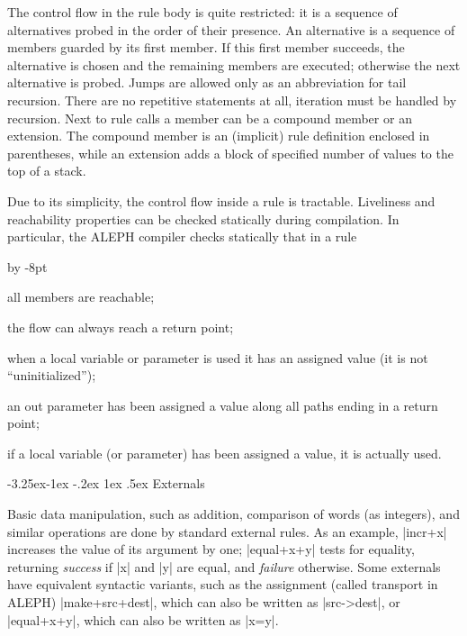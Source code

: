 \documentclass[titlepage]{article}
\makeatletter
\newcommand\A{\textsf{ALEPH}}
\renewenvironment{itemize}{\begin{list}{}{%
\advance\leftmargin by -8pt%
\setlength\itemsep{0ex plus 0.2ex}%
\setlength\partopsep{3pt}%
\setlength\topsep{2pt plus 2pt}%
\setlength\parsep{0pt plus 2pt}%
}}{\end{list}}
\newcommand\g[1]{\textsf{\color{blue!90!black}#1}}
\renewcommand\subsection{%
\@startsection{subsection}{2}{\z@}%
   {-3.25ex\@plus -1ex \@minus -.2ex}%
   {1ex \@plus .5ex}%
   {\normalfont\normalsize\bfseries}}
\makeatother
\begin{document}
The control flow in the rule body is quite restricted: it is a sequence of
alternatives probed in the order of their presence. An alternative is a
sequence of members guarded by its first member. If this first member
succeeds, the alternative is chosen and the remaining members are executed;
otherwise the next alternative is probed. Jumps are allowed only as an
abbreviation for tail recursion. There are no repetitive statements at all,
iteration must be handled by recursion. Next to rule calls a member can be a
\g{compound member} or an \g{extension}. The compound member is an
(implicit) rule definition enclosed in parentheses, while an extension adds
a block of specified number of values to the top of a \g{stack}.

Due to its simplicity, the control flow inside a rule is tractable.
Liveliness and reachability properties can be checked statically during
compilation. In particular, the \A{} compiler checks statically that in a
rule
\begin{itemize}
\item[\textbullet] all members are reachable;
\item[\textbullet] the flow can always reach a return point;
\item[\textbullet] when a local variable or parameter is used it has an
  assigned value (it is not ``uninitialized'');
\item[\textbullet] an out parameter has been assigned a value along all paths
 ending in a return point;
\item[\textbullet] if a local variable (or parameter) has been assigned a
value, it is actually used.
\end{itemize}

\subsection{Externals}\label{subsec:bird-ext}

Basic data manipulation, such as addition, comparison of words (as
integers), and similar operations are done by standard external rules. As
an example, \pp|incr+x| increases the value of its argument by one;
\pp|equal+x+y| tests for equality, returning \emph{success} if \pp|x| and
\pp|y| are equal, and \emph{failure} otherwise. Some externals have
equivalent syntactic variants, such as the assignment (called \g{transport}
in \A) \pp|make+src+dest|, which can also be written as \pp|src->dest|, or
\pp|equal+x+y|, which can also be written as \pp|x=y|.
\end{document}
